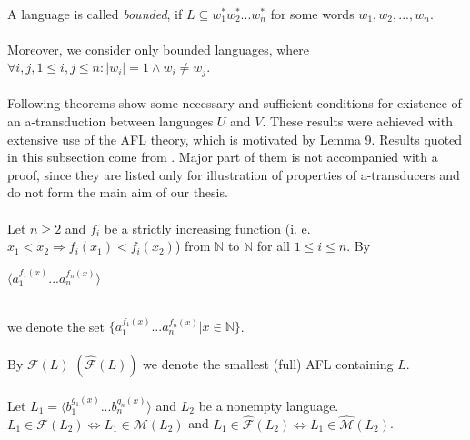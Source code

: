 \paragraph{}
 A language is called \emph{bounded}, if $L \subseteq w_{1}^{*}w_{2}^{*}...w_{n}^{*}$ for some words $w_{1}, w_{2}, ..., w_{n}$.

\paragraph{}
Moreover, we consider only bounded languages, where $\forall i, j, 1 \leq i,j \leq n: |w_{i}| = 1 \wedge w_{i} \neq w_{j}$. 

\paragraph{}
Following theorems show some necessary and sufficient conditions for existence of an a-transduction between languages $U$ and $V$. These results were achieved with extensive use of the AFL theory, which is motivated by Lemma 9. Results quoted in this subsection come from \cite{Rovan:AFL}. Major part of them is not accompanied with a proof, since they are listed only for illustration of properties of a-transducers and do not form the main aim of our thesis.

\paragraph{}
\oznacenie Let $n \geq 2$ and $f_{i}$ be a strictly increasing function (i. e. $x_{1} < x_{2} \Rightarrow f_{i}(x_{1}) < f_{i}(x_{2})$) from $\mathbb{N} $ to $\mathbb{N} $ for all $ 1 \leq i \leq n$. By \\
\centerline{$\langle a_{1}^{f_{1}(x)}...a_{n}^{f_{n}(x)} \rangle $} \\
we denote the set $\{ a_{1}^{f_{1}(x)}...a_{n}^{f_{n}(x)} | x \in \mathbb{N} \} $.

\paragraph{}
\oznacenie By $\mathcal{F}(L) $ $(\hat{\mathcal{F}} (L) )$ we denote the smallest (full) AFL containing $L$.

\paragraph{}
\clema Let $L_{1} = \langle b_{1}^{g_{1}(x)}...b_{n}^{g_{n}(x)} \rangle $ and $L_{2}$ be a nonempty language. $L_{1} \in \mathcal{F}(L_{2}) \Leftrightarrow L_{1} \in \mathcal{M}(L_{2})$ and $L_{1} \in \hat{\mathcal{F}}(L_{2}) \Leftrightarrow L_{1} \in \hat{\mathcal{M}}(L_{2})$.


